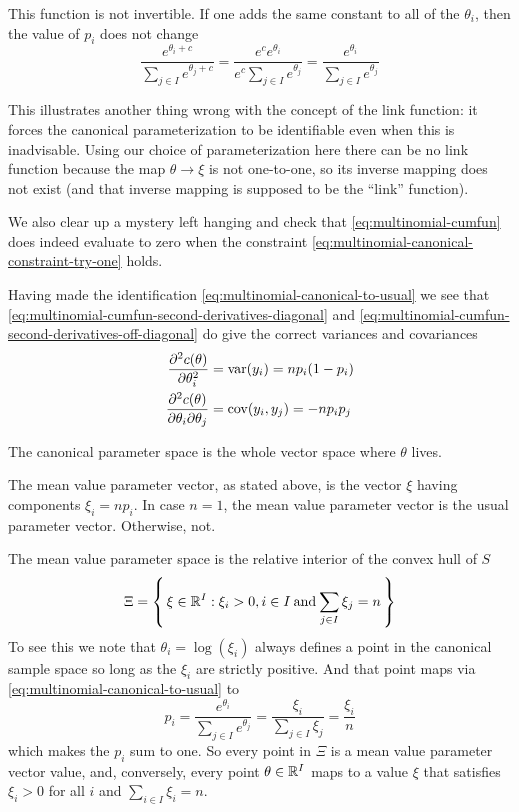 This function is not invertible.  If one adds the same constant
to all of the $\theta_i$, then the value of $p_i$ does not change
$$
   \frac{e^{\theta_i + c}}{\sum_{j \in I} e^{\theta_j + c}}
   =
   \frac{e^c e^{\theta_i}}{e^c \sum_{j \in I} e^{\theta_j}}
   =
   \frac{e^{\theta_i}}{\sum_{j \in I} e^{\theta_j}}
$$

This illustrates another thing wrong with the concept of the link function:
it forces the canonical parameterization to be identifiable even when this
is inadvisable.  Using our choice of parameterization here there can be
no link function because the map $\theta \to \xi$ is not one-to-one, so
its inverse mapping does not exist (and that inverse mapping is supposed to
be the ``link'' function).

We also clear up a mystery left hanging and check
that \eqref{eq:multinomial-cumfun} does indeed evaluate to zero when the
constraint \eqref{eq:multinomial-canonical-constraint-try-one} holds.

Having made the identification \eqref{eq:multinomial-canonical-to-usual}
we see that \eqref{eq:multinomial-cumfun-second-derivatives-diagonal}
and \eqref{eq:multinomial-cumfun-second-derivatives-off-diagonal}
do give the correct variances and covariances
\begin{align*}
   \frac{\partial^2 c(\theta)}{\partial \theta_i^2}
   & =
   \operatorname{var}(y_i) = n p_i (1 - p_i)
   \\
   \frac{\partial^2 c(\theta)}{\partial \theta_i \partial \theta_j}
   & =
   \operatorname{cov}(y_i, y_j) = - n p_i p_j
\end{align*}

The canonical parameter space is the whole vector space where $\theta$ lives.

The mean value parameter vector, as stated above, is the vector $\xi$ having
components $\xi_i = n p_i$.  In case $n = 1$, the mean value parameter vector
is the usual parameter vector.  Otherwise, not.

The mean value parameter space is the relative interior of the
convex hull of $S$
\begin{equation} \label{eq:multinomial-mean-value-parameter-space}
   \Xi
   =
   \left\{\,  \xi \in \mathbb{R}^I : \xi_i > 0, i \in I \mathbin{\rm and}
   \sum_{j \in I} \xi_j = n  \,\right\}
\end{equation}
To see this we note that $\theta_i = \log(\xi_i)$ always defines a point
in the canonical sample space so long as the $\xi_i$ are strictly positive.
And that point maps via \eqref{eq:multinomial-canonical-to-usual} to
$$
   p_i = \frac{e^{\theta_i}}{\sum_{j \in I} e^{\theta_j}}
   =
   \frac{\xi_i}{\sum_{j \in I} \xi_j} = \frac{\xi_i}{n}
$$
which makes the $p_i$ sum to one.
So every point in $\Xi$ is a mean value parameter vector value,
and, conversely, every point $\theta \in \mathbb{R}^I$ maps to a value $\xi$
that satisfies $\xi_i > 0$ for all $i$ and $\sum_{i \in I} \xi_i = n$.

